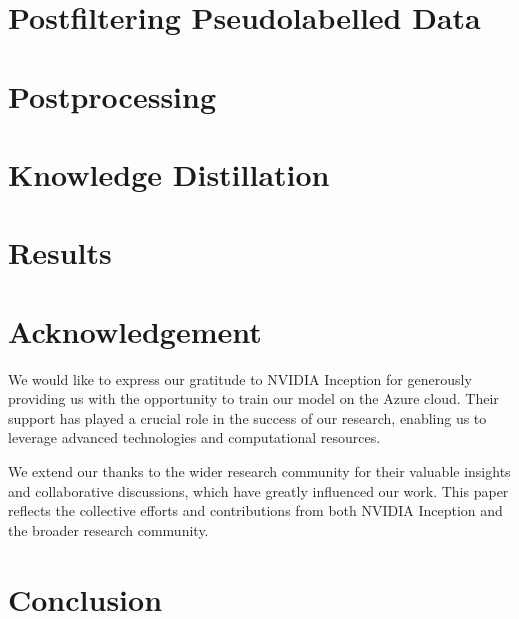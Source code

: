 \documentclass[preprint]{article}
\begin{document}
\section{Postfiltering Pseudolabelled Data}


\section{Postprocessing}


\section{Knowledge Distillation}


\section{Results}



\section{Acknowledgement}


We would like to express our gratitude to NVIDIA Inception for generously providing us with the opportunity to train our model on the Azure cloud. Their support has played a crucial role in the success of our research, enabling us to leverage advanced technologies and computational resources.

We extend our thanks to the wider research community for their valuable insights and collaborative discussions, which have greatly influenced our work. This paper reflects the collective efforts and contributions from both NVIDIA Inception and the broader research community.

\section{Conclusion}


{}

\end{document}
